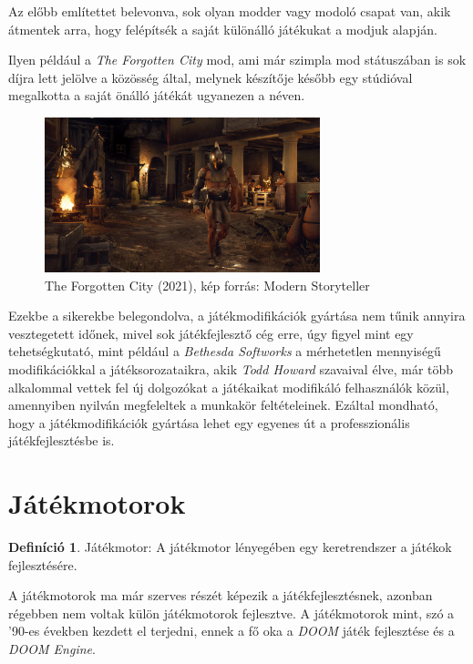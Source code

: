 \documentclass[]{thesis-ekf}
\theoremstyle{definition}
\newtheorem{definicio}{Definíció}[chapter]
\begin{document}
	Az előbb említettet belevonva, sok olyan modder vagy modoló csapat van, akik átmentek arra, hogy felépítsék a saját különálló játékukat a modjuk alapján.
	
	Ilyen például a \emph{The Forgotten City} mod\cite{mod-forgcity}, ami már szimpla mod státuszában is sok díjra lett jelölve a közösség által, melynek készítője később egy stúdióval megalkotta a saját önálló játékát ugyanezen a néven.
	
	
	\begin{figure}[!ht]
		\label{kep:forgcity1}
		\centering
		\includegraphics[width=8cm]{forgcity1}
		\caption{The Forgotten City (2021), kép forrás: Modern Storyteller\cite{pic-forgcity}}
	\end{figure}
	
	Ezekbe a sikerekbe belegondolva, a játékmodifikációk gyártása nem tűnik annyira vesztegetett időnek, mivel sok játékfejlesztő cég erre, úgy figyel mint egy tehetségkutató, mint például a \emph{Bethesda Softworks} a mérhetetlen mennyiségű modifikációkkal a játéksorozataikra, akik \emph{Todd Howard} szavaival élve, már több alkalommal vettek fel új dolgozókat a játékaikat modifikáló felhasználók közül, amennyiben nyilván megfeleltek a munkakör feltételeinek. Ezáltal mondható, hogy a játékmodifikációk gyártása lehet egy egyenes út a professzionális játékfejlesztésbe is.
		
	\section{Játékmotorok}
	\begin{definicio}
		Játékmotor:
		A játékmotor lényegében egy keretrendszer a játékok fejlesztésére.
	\end{definicio}
	
	A játékmotorok ma már szerves részét képezik a játékfejlesztésnek, azonban régebben nem voltak külön játékmotorok fejlesztve.
	A játékmotorok mint, szó a '90-es években kezdett el terjedni, ennek a fő oka a \emph{DOOM} játék fejlesztése és a \emph{DOOM Engine}.
	
\end{document}
